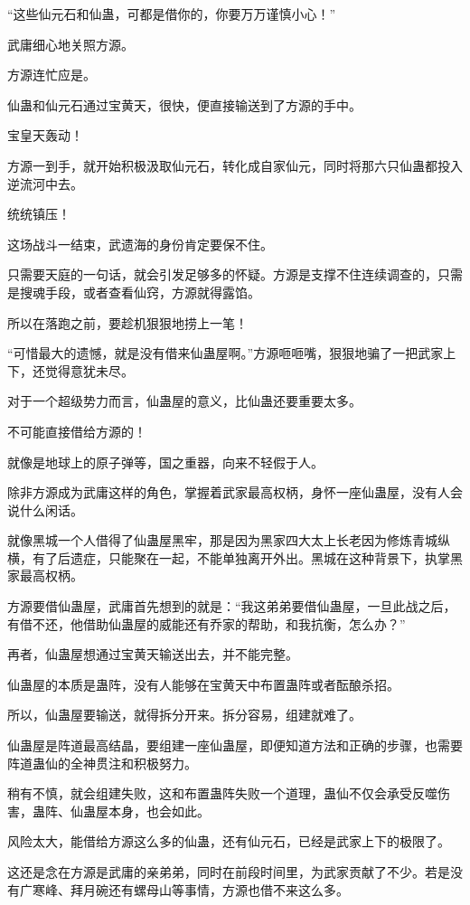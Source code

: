 \begin{this_body}
“这些仙元石和仙蛊，可都是借你的，你要万万谨慎小心！”

武庸细心地关照方源。

方源连忙应是。

仙蛊和仙元石通过宝黄天，很快，便直接输送到了方源的手中。

宝皇天轰动！

方源一到手，就开始积极汲取仙元石，转化成自家仙元，同时将那六只仙蛊都投入逆流河中去。

统统镇压！

这场战斗一结束，武遗海的身份肯定要保不住。

只需要天庭的一句话，就会引发足够多的怀疑。方源是支撑不住连续调查的，只需是搜魂手段，或者查看仙窍，方源就得露馅。

所以在落跑之前，要趁机狠狠地捞上一笔！

“可惜最大的遗憾，就是没有借来仙蛊屋啊。”方源咂咂嘴，狠狠地骗了一把武家上下，还觉得意犹未尽。

对于一个超级势力而言，仙蛊屋的意义，比仙蛊还要重要太多。

不可能直接借给方源的！

就像是地球上的原子弹等，国之重器，向来不轻假于人。

除非方源成为武庸这样的角色，掌握着武家最高权柄，身怀一座仙蛊屋，没有人会说什么闲话。

就像黑城一个人借得了仙蛊屋黑牢，那是因为黑家四大太上长老因为修炼青城纵横，有了后遗症，只能聚在一起，不能单独离开外出。黑城在这种背景下，执掌黑家最高权柄。

方源要借仙蛊屋，武庸首先想到的就是：“我这弟弟要借仙蛊屋，一旦此战之后，有借不还，他借助仙蛊屋的威能还有乔家的帮助，和我抗衡，怎么办？”

再者，仙蛊屋想通过宝黄天输送出去，并不能完整。

仙蛊屋的本质是蛊阵，没有人能够在宝黄天中布置蛊阵或者酝酿杀招。

所以，仙蛊屋要输送，就得拆分开来。拆分容易，组建就难了。

仙蛊屋是阵道最高结晶，要组建一座仙蛊屋，即便知道方法和正确的步骤，也需要阵道蛊仙的全神贯注和积极努力。

稍有不慎，就会组建失败，这和布置蛊阵失败一个道理，蛊仙不仅会承受反噬伤害，蛊阵、仙蛊屋本身，也会如此。

风险太大，能借给方源这么多的仙蛊，还有仙元石，已经是武家上下的极限了。

这还是念在方源是武庸的亲弟弟，同时在前段时间里，为武家贡献了不少。若是没有广寒峰、拜月碗还有螺母山等事情，方源也借不来这么多。


\end{this_body}
